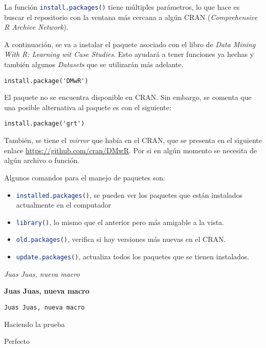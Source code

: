 \documentclass{article}
\begin{document}
La función \lstinline[language=R]{install.packages()} tiene múltiples parámetros, lo que hace es buscar el repositorio con la
ventana más cercana a algún CRAN (\textit{Comprehensive R Archive Network}).

A continuación, se va a instalar el paquete asociado con el libro de \textit{Data Mining With R: Learning wit Case Studies}. Esto ayudará a tener funciones ya hechas y también algunos \textit{Datasets} que se utilizarán más adelante.
\begin{lstlisting}
install.package('DMwR')
\end{lstlisting}

El paquete no se encuentra disponible en CRAN. Sin embargo, se comenta que una posible alternativa al paquete es con el siguiente:
\begin{lstlisting}
install.package('grt')
\end{lstlisting}

También, se tiene el \textit{mirror} que había en el CRAN, que se presenta en el siguiente enlace
\url{https://github.com/cran/DMwR}. Por si en algún momento se necesita de algún archivo o función.

Algunos comandos para el manejo de paquetes son:
\begin{itemize}
  \item \lstinline[language=R]{installed.packages()}, se pueden ver los paquetes que están instalados actualmente en el computador
  \item \lstinline[language=R]{library()}, lo mismo que el anterior pero más amigable a la vista.
  \item \lstinline[language=R]{old.packages()}, verifica si hay versiones más nuevas en el CRAN.
  \item \lstinline[language=R]{update.packages()}, actualiza todos los paquetes que se tienen instalados.
\end{itemize}


\textit{Juas Juas, nueva macro}

\textbf{Juas Juas, nueva macro}

\texttt{Juas Juas, nueva macro}

Haciendo la prueba

Perfecto
\end{document}

